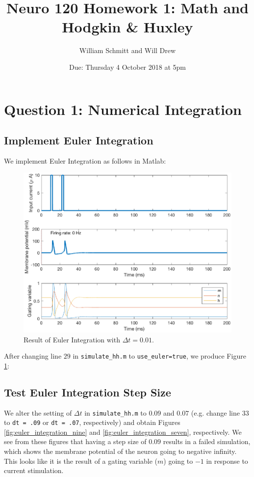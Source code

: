 \documentclass[11pt, oneside]{article}
\title{Neuro 120 Homework 1: Math and Hodgkin \& Huxley}
\author{William Schmitt and Will Drew}
\date{Due: Thursday 4 October 2018 at 5pm}
\begin{document}
\maketitle

\section{Question 1: Numerical Integration}

\subsection{Implement Euler Integration}
We implement Euler Integration as follows in Matlab:


\begin{figure}[ht!]
\centering
\includegraphics[width=1\textwidth]{simulate_hh_dt_1.eps}
\caption{Result of Euler Integration with $\Delta t = 0.01$.}
\label{fig:euler_integration_one}
\end{figure}

After changing line $29$ in \lstinline{simulate_hh.m} to \lstinline{use_euler=true}, we produce Figure \ref{fig:euler_integration_one}:

\subsection{Test Euler Integration Step Size}
We alter the setting of $\Delta t$ in \lstinline{simulate_hh.m} to $0.09$ and $0.07$ (e.g. change line 33 to \lstinline{dt = .09} or \lstinline{dt = .07}, respectively) and obtain Figures \ref{fig:euler_integration_nine} and \ref{fig:euler_integration_seven}, respectively. We see from these figures that having a step size of $0.09$ results in a failed simulation, which shows the membrane potential of the neuron going to negative infinity. This looks like it is the result of a gating variable ($m$) going to $-1$ in response to current stimulation.
\end{document}
